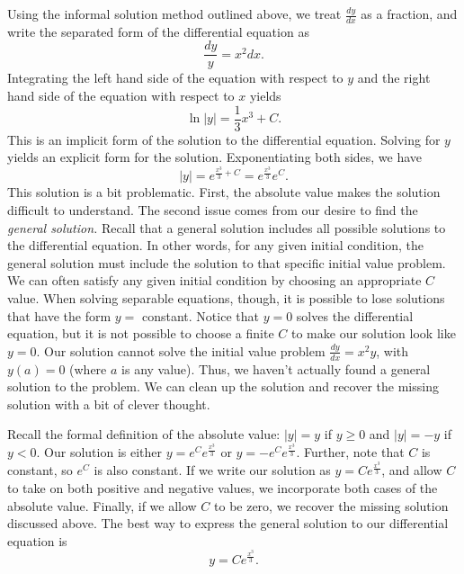 {Using the informal solution method outlined above, we treat $\displaystyle \frac{dy}{dx}$ as a fraction, and write the separated form of the differential equation as
\[\frac{dy}{y} = x^2 dx.\]
Integrating the left hand side of the equation with respect to $y$ and the right hand side of the equation with respect to $x$ yields
\[\ln |y| = \frac{1}{3}x^3 + C.\]
This is an implicit form of the solution to the differential equation.  Solving for $y$ yields an explicit form for the solution.  Exponentiating both sides, we have
\[|y| = e^{\frac{x^3}{3} + C} = e^{\frac{x^3}{3}}e^C.\]
This solution is a bit problematic. First, the absolute value makes the solution difficult to understand.  The second issue comes from our desire to find the \emph{general solution.}  Recall that a general solution includes all possible solutions to the differential equation.  In other words, for any given initial condition, the general solution must include the solution to that specific initial value problem.  We can often satisfy any given initial condition by choosing an appropriate $C$ value.  When solving separable equations, though, it is possible to lose solutions that have the form $y = $ constant.  Notice that $y=0$ solves the differential equation, but it is not possible to choose a finite $C$ to make our solution look like $y=0$.  Our solution cannot solve the initial value problem $\displaystyle \frac{dy}{dx} = x^2y$, with $y(a) = 0$ (where $a$ is any value).  Thus, we haven't actually found a general solution to the problem. We can clean up the solution and recover the missing solution with a bit of clever thought.

Recall the formal definition of the absolute value: $|y| = y$ if $y \geq 0$ and $|y| =  -y$ if $y < 0.$
Our solution is either $y = e^C e^{\frac{x^3}{3}}$ or $y = - e^C e^{\frac{x^3}{3}}$.  Further, note that $C$ is constant, so $e^C$ is also constant.  If we write our solution as $y = Ce^{\frac{x^3}{3}}$, and allow $C$ to take on both positive and negative values, we incorporate both cases of the absolute value. Finally, if we allow $C$ to be zero, we recover the missing solution discussed above.  The best way to express the general solution to our differential equation is
\[y = Ce^{\frac{x^3}{3}}.\]
}


